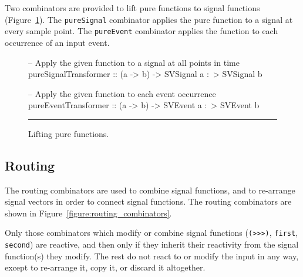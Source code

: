 Two combinators are provided to lift pure functions to signal functions (Figure~\ref{figure:lifting_pure_functions}).
The {\tt pureSignal} combinator applies the pure function to a signal at every
sample point. The {\tt pureEvent} combinator applies the function to each
occurrence of an input event.

\begin{figure}
\begin{code}
-- Apply the given function to a signal at all points in time
pureSignalTransformer :: (a -> b) -> SVSignal a :~> SVSignal b

-- Apply the given function to each event occurrence
pureEventTransformer  :: (a -> b) -> SVEvent a :~> SVEvent b
\end{code}
\hrule
\caption{Lifting pure functions.}
\label{figure:lifting_pure_functions}
\end{figure}

\subsection{Routing}
\label{subsection:System_Design_and_Interface-Combinators-Routing}

The routing combinators are used to combine signal functions, and
to re-arrange signal vectors in order to connect signal functions.
The routing combinators are shown in Figure~\ref{figure:routing_combinators}.

Only those combinators which modify or combine signal functions
({\tt (>>>)}, {\tt first}, {\tt second}) are reactive, and then
only if they inherit their reactivity from the signal function(s)
they modify. The rest do not react to or modify the input in any
way, except to re-arrange it, copy it, or discard it altogether.

